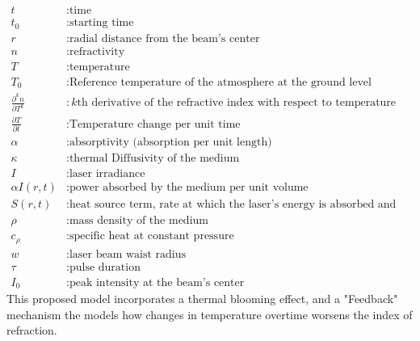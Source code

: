 \documentclass[a4paper, 12pt]{amsbook}
\begin{document}
\begin{equation*}
    \begin{aligned}
        t &: \text{time} \\
        t_0 &: \text{starting time} \\
        r &: \text{radial distance from the beam's center} \\
        n&: \text{refractivity} \\
        T&: \text{temperature} \\
        T_0 &: \text{Reference temperature of the atmosphere at the ground level} \\
        \frac{\partial^k n}{\partial T^k} &: \text{$k$th derivative of the refractive index with respect to temperature} \\
        \frac{\partial T}{\partial t} &: \text{Temperature change per unit time} \\
        \alpha&: \text{absorptivity (absorption per unit length)} \\
        \kappa &: \text{thermal Diffusivity of the medium}\\
        I&: \text{laser irradiance}  \\
        \alpha I(r,t) &: \text{power absorbed by the medium per unit volume} \\
        S(r,t) &: \text{heat source term, rate at which the laser's energy is absorbed and converted into heat}\\
        \rho &: \text{mass density of the medium} \\
        c_\rho &: \text{specific heat at constant pressure} \\
        w &: \text{laser beam waist radius} \\
        \tau &: \text{pulse duration} \\
        I_0 &: \text{peak intensity at the beam's center}
    \end{aligned}
\end{equation*}
This proposed model incorporates a thermal blooming effect, and a "Feedback" mechanism the models how changes in temperature overtime worsens the index of refraction.
\end{document}
